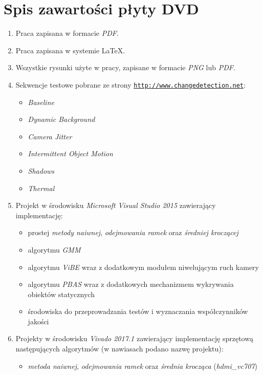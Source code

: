 \chapter{Spis zawartości płyty DVD}
\label{appx:plyta}

\begin{enumerate}
\item{Praca zapisana w formacie \textit{\small{PDF}}.}
\item{Praca zapisana w systemie \LaTeX.}
\item{Wszystkie rysunki użyte w pracy, zapisane w formacie \textit{\small{PNG}} lub \textit{\small{PDF}}.}
\item{
		Sekwencje testowe pobrane ze strony \underline{\texttt{\small{http://www.changedetection.net}}}:
		\begin{itemize}
			\setlength\itemsep{0em}
			\item{\textit{Baseline}}
			\item{\textit{Dynamic Background}}
			\item{\textit{Camera Jitter}}
			\item{\textit{Intermittent Object Motion}}
			\item{\textit{Shadows}}
			\item{\textit{Thermal}}
		\end{itemize}
}
\item{
		Projekt w środowisku \textit{Microsoft Visual Studio 2015} zawierający implementację:
		\begin{itemize}
			\setlength\itemsep{0em}
			\item{prostej \textit{metody naiwnej}, \textit{odejmowania ramek} oraz \textit{średniej kroczącej}}
			\item{algorytmu \textit{GMM}}
			\item{algorytmu \textit{ViBE} wraz z dodatkowym modułem niwelującym ruch kamery}
			\item{algorytmu \textit{PBAS} wraz z dodatkowych mechanizmem wykrywania obiektów statycznych}
			\item{środowiska do przeprowadzania testów i wyznaczania współczynników jakości}
		\end{itemize}				
}
\item{Projekty w środowisku \textit{Vivado 2017.1} zawierający implementację sprzętową następujących algorytmów (w nawiasach podano nazwę projektu):
		\begin{itemize}
			\setlength\itemsep{0em}
			\item{\textit{metoda naiwnej}, \textit{odejmowania ramek} oraz \textit{średnia krocząca} (\textit{hdmi\_vc707})}

\end{itemize}}
\end{enumerate}
